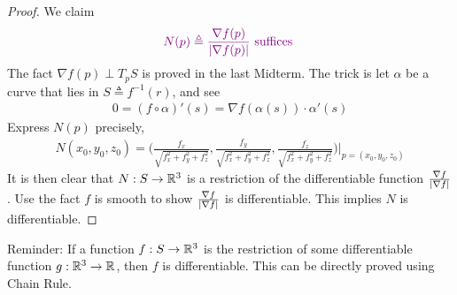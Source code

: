 \documentclass{report}
\begin{document}
\begin{proof}
We claim 
\begin{align*}
\textcolor{violet}{N(p)\triangleq \frac{\nabla f(p)}{\left|\nabla f(p)\right|}\text{ suffices }}
\end{align*}
The fact $\nabla f(p)\perp T_pS$ is proved in the last Midterm. The trick is let $\alpha $ be a curve that lies in $S\triangleq f^{-1}(r)$, and see 
\begin{align*}
0=(f\circ \alpha )'(s)=\nabla f(\alpha (s))\cdot \alpha '(s)
\end{align*}
Express $N(p)$ precisely,  
\begin{align*}
N(x_0,y_0,z_0)= \Big(\frac{f_x}{\sqrt{f_x^2+f_y^2+f_z^2} }, \frac{f_y}{\sqrt{f_x^2+f_y^2+f_z^2} }, \frac{f_z}{\sqrt{f_x^2+f_y^2+f_z^2} } \Big)\Big|_{p=(x_0,y_0,z_0)}
\end{align*}
It is then clear that $N:S\rightarrow \mathbb{R}^3$ is a restriction of the differentiable function $\frac{\nabla f}{\left|\nabla f\right|}$. Use the fact $f$ is smooth to show $\frac{\nabla f}{\left|\nabla f\right|}$ is differentiable. This implies $N$ is differentiable. 
\end{proof} 
\begin{mdframed}
Reminder: If a function $f:S\rightarrow \mathbb{R}^3$ is the restriction of some differentiable function $g:\mathbb{R}^3\rightarrow \mathbb{R}$, then $f$ is differentiable. This can be directly proved using Chain Rule. 
\end{mdframed}
\end{document}
